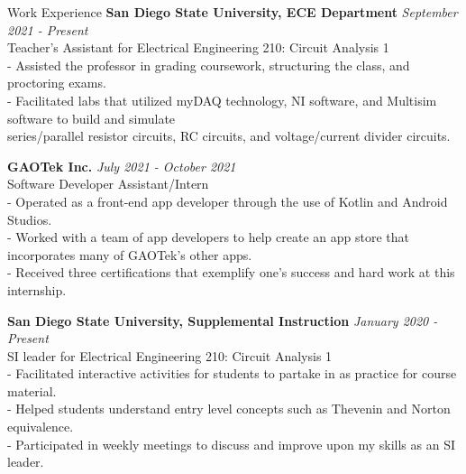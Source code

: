 \documentclass{resume} %
\begin{document}
\begin{rSection}{Work Experience}
{\bf San Diego State University, ECE Department  } \hfill {\em September 2021 - Present} 
\\Teacher’s Assistant for Electrical Engineering 210: Circuit Analysis 1
\\- Assisted the professor in grading coursework, structuring the class, and proctoring exams.
\\-  Facilitated labs that utilized myDAQ technology, NI software, and Multisim software to build and simulate       \\\hspace*{0.5em}series/parallel resistor circuits, RC circuits, and voltage/current divider circuits.  

{\bf GAOTek Inc.   } \hfill {\em July 2021 - October 2021} 
\\Software Developer Assistant/Intern
\\- Operated as a front-end app developer through the use of Kotlin and Android Studios.
\\- Worked with a team of app developers to help create an app store that incorporates many of GAOTek’s other apps.
\\- Received three certifications that exemplify one's success and hard work at this internship.

{\bf San Diego State University, Supplemental Instruction   } \hfill {\em January 2020 - Present} 
\\SI leader for Electrical Engineering 210: Circuit Analysis 1
\\- Facilitated interactive activities for students to partake in as practice for course material.
\\- Helped students understand entry level concepts such as Thevenin and Norton equivalence.
\\- Participated in weekly meetings to discuss and improve upon my skills as an SI leader.       





\end{rSection}
\end{document}
